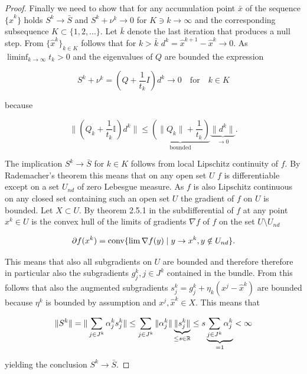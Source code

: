 \begin{proof}
	Finally we need to show that for any accumulation point \(\bar{x}\) of the sequence \(\{\hat{x}^k\}\) holds \(S^k \to \bar{S}\) and \(S^k+\nu^k \to 0\) for \(K \ni k \to \infty\) and the corresponding subsequence \(K \subset \{1,2,...\}\).
Let \(\bar{k}\) denote the last iteration that produces a null step. From \(\{\hat{x}^k\}_{k \in K}\)  follows that for \(k > \bar{k}\) \(d^k = \hat{x}^{k+1}-\hat{x}^k \to 0\). As \(\liminf_{k \to \infty} t_k > 0\) and the eigenvalues of \(Q\) are bounded the expression 
	
	\begin{equation*}
	 S^k + \nu^k = \left(Q+\frac{1}{t_k}I \right)d^k  \to 0 \quad \text{for} \quad k \in K
	\end{equation*}
	
	because 
	
	\[ \|\left(Q_k+\frac{1}{t_k}\mathbb{I}\right)d^k \| \leq \underbrace{\left(\|Q_k\|+\frac{1}{t_k}\right)}_{\text{bounded}}\underbrace{\|d^k\|}_{\to 0}.\]
	
	The implication \(S^k \to \bar{S}\) for \(k \in K\) follows from local Lipschitz continuity of \(f\).
	By Rademacher's theorem this means that on any open set \(U\) \(f\) is differentiable except on a set \(U_{nd}\) of zero Lebesgue measure. As \(f\) is also Lipschitz continuous on any closed set containing such an open set \(U\) the gradient of \(f\) on \(U\) is bounded.
	Let \(X \subset U\). By theorem 2.5.1 in \cite{Clarke1990} the subdifferential of \(f\) at any point \(x^k \in U\) is the convex hull of the limits of gradients \(\nabla f\) of \(f\) on the set \(U\setminus U_{nd}\)
	
		\[ \partial f(x^k) = \text{conv}\{\lim \nabla f(y) \mid y \to x^k, y \notin U_{nd}\}. \]
		
		This means that also all subgradients on \(U\) are bounded and  therefore therefore in particular also the subgradients \(g_j^k, j \in J^k\) contained in the bundle.
		From this follows that also the augmented subgradients \(s_j^k = g^k_j+\eta_k(x^j-\hat{x}^k)\) are bounded because \(\eta^k\) is bounded by assumption and \(x^j, \hat{x}^k \in X\). 
		This means that 
		
		\[\|S^k\| = \|\sum_{j \in J^k}{\alpha_j^k s_j^k}\| \leq  \sum_{j \in J^k}{\|\alpha_j^k\|\underbrace{\|s^k_j\|}_{\leq s \in \mathbb{R}}} \leq s\underbrace{\sum_{j \in J^k}{\alpha_j^k}}_{=1} < \infty\]
		
		yielding the conclusion \(S^k \to \bar{S}\).
		
	
\end{proof}

